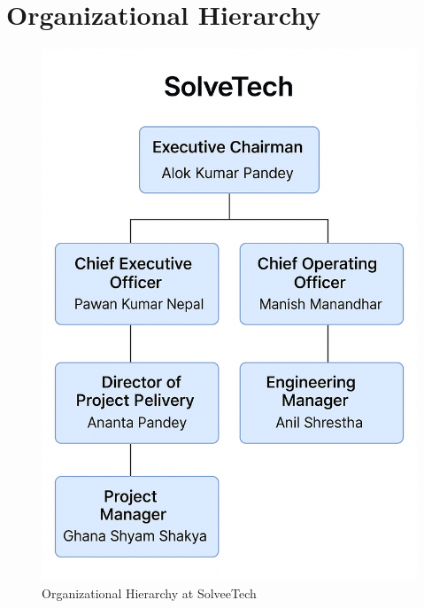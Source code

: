 \section{Organizational Hierarchy}


\begin{figure}[h]
  \centering
  \includegraphics[width=.45\linewidth]{contents/chapters/chapter2/images/Organization_Hierarchy.png}
  \caption{Organizational Hierarchy at SolveeTech}\label{fig:example}
\end{figure}
